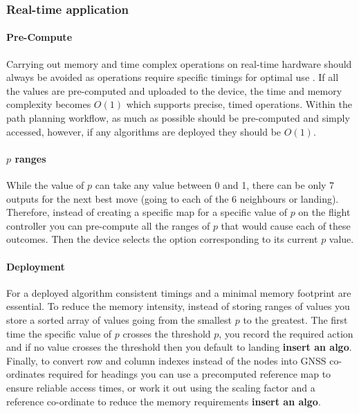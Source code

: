 \subsubsection{Real-time application}
\paragraph{Pre-Compute}
Carrying out memory and time complex operations on real-time hardware should always be avoided as operations require specific timings for optimal use \cite{REF}. If all the values are pre-computed and uploaded to the device, the time and memory complexity becomes $O(1)$ which supports precise, timed operations. Within the path planning workflow, as much as possible should be pre-computed and simply accessed, however, if any algorithms are deployed they should be $O(1)$.
\paragraph{$p$ ranges}
While the value of $p$ can take any value between 0 and 1, there can be only 7 outputs for the next best move (going to each of the 6 neighbours or landing). Therefore, instead of creating a specific map for a specific value of $p$ on the flight controller you can pre-compute all the ranges of $p$ that would cause each of these outcomes. Then the device selects the option corresponding to its current $p$ value.
\paragraph{Deployment}
For a deployed algorithm consistent timings and a minimal memory footprint are essential. To reduce the memory intensity, instead of storing ranges of values you store a sorted array of values going from the smallest $p$ to the greatest. The first time the specific value of $p$ crosses the threshold $p$, you record the required action and if no value crosses the threshold then you default to landing \textbf{insert an algo}. Finally, to convert row and column indexes instead of the nodes into \gls{GNSS} co-ordinates required for headings you can use a precomputed reference map to ensure reliable access times, or work it out using the scaling factor and a reference co-ordinate to reduce the memory requirements \textbf{insert an algo}.
